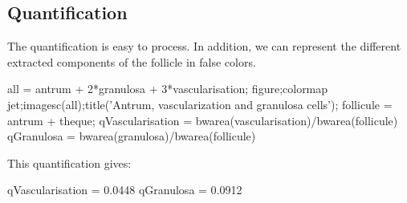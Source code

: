 \subsection{Quantification}
The quantification is easy to process. In addition, we can represent the different extracted components of the follicle in false colors.

\begin{matlab}
all = antrum + 2*granulosa + 3*vascularisation;
figure;colormap jet;imagesc(all);title('Antrum, vascularization and granulosa cells');
follicule = antrum + theque;
qVascularisation = bwarea(vascularisation)/bwarea(follicule)
qGranulosa = bwarea(granulosa)/bwarea(follicule)
\end{matlab}

\noindent This quantification gives:
\begin{mwindow}
qVascularisation = 0.0448
qGranulosa = 0.0912
\end{mwindow}
